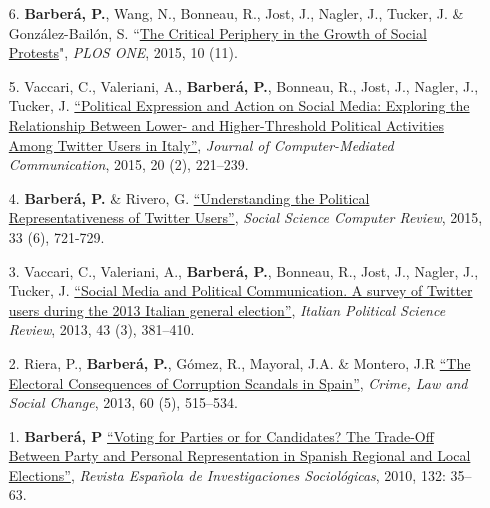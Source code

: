 \documentclass[margin,line,11pt]{resume}
\begin{document}
\begin{resume}
\begin{itemize}[leftmargin=5.5mm]
\item[6.] \textbf{Barber\'{a}, P.}, Wang, N., Bonneau, R., Jost, J., Nagler, J., Tucker, J. \& Gonz\'{a}lez-Bail\'{o}n, S. ``\href{http://journals.plos.org/plosone/article?id=10.1371/journal.pone.0143611}{The Critical Periphery in the Growth of Social Protests}", \textit{PLOS ONE}, 2015, 10 (11).

\item[5.] Vaccari, C., Valeriani, A., \textbf{Barber\'{a}, P.}, Bonneau, R., Jost, J., Nagler, J., Tucker, J. \href{http://onlinelibrary.wiley.com/doi/10.1111/jcc4.12108/abstract#.VLRLl9mdVFM.twitter}{``Political Expression and Action on Social Media: Exploring the Relationship Between Lower- and Higher-Threshold Political Activities Among Twitter Users in Italy''}, \emph{Journal of Computer-Mediated Communication}, 2015, 20 (2), 221--239.

\newpage 

\item[4.] \textbf{Barber\'{a}, P.} \& Rivero, G. \href{http://ssc.sagepub.com/content/33/6/712}{``Understanding the Political Representativeness of Twitter Users''}, \textit{Social Science Computer Review}, 2015, 33 (6), 721-729.

\item[3.] Vaccari, C., Valeriani, A., \textbf{Barber\'{a}, P.}, Bonneau, R., Jost, J., Nagler, J., Tucker, J. \href{http://www.rivisteweb.it/doi/10.1426/75245}{``Social Media and Political Communication. A survey of Twitter users during the 2013 Italian general election''}, \emph{Italian Political Science Review}, 2013, 43 (3), 381--410.

\item[2.] Riera, P., \textbf{Barber\'{a}, P.}, G\'{o}mez, R., Mayoral, J.A. \& Montero, J.R \href{http://link.springer.com/article/10.1007/s10611-013-9479-1}{``The Electoral Consequences of Corruption Scandals in Spain''}, \emph{Crime, Law and Social Change}, 2013, 60 (5), 515--534.

\item[1.] \textbf{Barber\'{a}, P} \href{http://www.reis.cis.es/REIS/PDF/REIS_132_021285919804928.pdf}{``Voting for Parties or for Candidates? The Trade-Off Between Party and Personal Representation in Spanish Regional and Local Elections''}, \emph{Revista Espa\~{n}ola de Investigaciones Sociol\'{o}gicas}, 2010, 132: 35--63.

\end{itemize}    




\end{resume}
\end{document}
